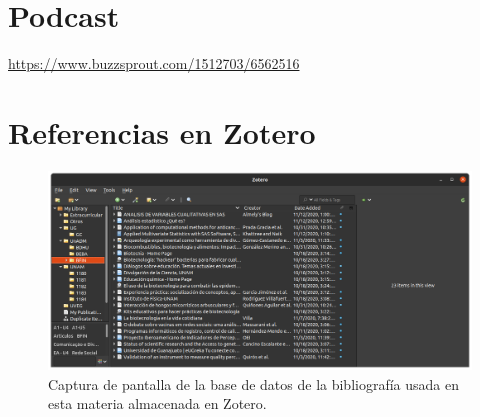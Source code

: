 \documentclass[12pt]{article}
\begin{document}
\section{Podcast}
	\url{https://www.buzzsprout.com/1512703/6562516}

\section{Referencias en Zotero}
	\begin{figure}[h]
		\centering
		\includegraphics[width=1.1\textwidth]{zotero-final.png}
		\caption{Captura de pantalla de la base de datos de la bibliografía usada en esta materia almacenada en Zotero.}
		\label{zotero final}
	\end{figure}
\end{document}
